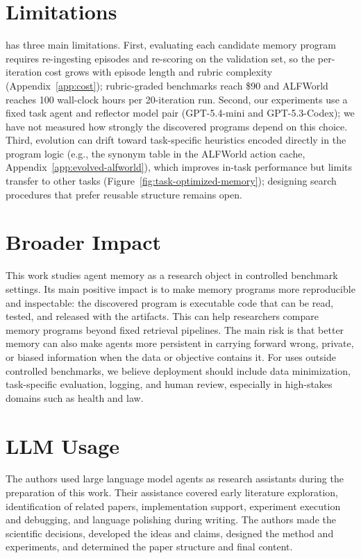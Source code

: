 
\section{Limitations}
\label{app:limitations}

\sysname{} has three main limitations.
First, evaluating each candidate memory program requires re-ingesting episodes and re-scoring on the validation set, so the per-iteration cost grows with episode length and rubric complexity (Appendix~\ref{app:cost}); rubric-graded benchmarks reach \$90 and ALFWorld reaches 100 wall-clock hours per 20-iteration run.
Second, our experiments use a fixed task agent and reflector model pair (GPT-5.4-mini and GPT-5.3-Codex); we have not measured how strongly the discovered programs depend on this choice.
Third, evolution can drift toward task-specific heuristics encoded directly in the program logic (e.g., the synonym table in the ALFWorld action cache, Appendix~\ref{app:evolved-alfworld}), which improves in-task performance but limits transfer to other tasks (Figure~\ref{fig:task-optimized-memory}); designing search procedures that prefer reusable structure remains open.

\section{Broader Impact}
\label{app:broader-impact}

This work studies agent memory as a research object in controlled benchmark settings.
Its main positive impact is to make memory programs more reproducible and inspectable: the discovered program is executable code that can be read, tested, and released with the artifacts.
This can help researchers compare memory programs beyond fixed retrieval pipelines.
The main risk is that better memory can also make agents more persistent in carrying forward wrong, private, or biased information when the data or objective contains it.
For uses outside controlled benchmarks, we believe deployment should include data minimization, task-specific evaluation, logging, and human review, especially in high-stakes domains such as health and law.

\section{LLM Usage}
\label{app:llm-usage}

The authors used large language model agents as research assistants during the preparation of this work.
Their assistance covered early literature exploration, identification of related papers, implementation support, experiment execution and debugging, and language polishing during writing.
The authors made the scientific decisions, developed the ideas and claims, designed the method and experiments, and determined the paper structure and final content.
